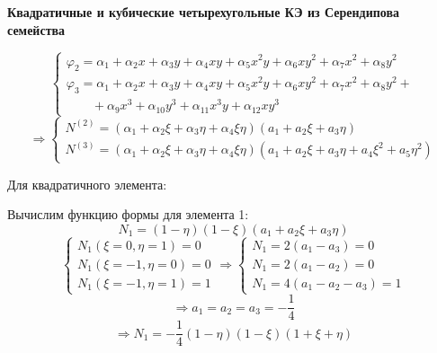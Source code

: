 \begin{center}
	\textbf{Квадратичные и кубические четырехугольные КЭ из Серендипова семейства}
\end{center}
\[
\begin{cases}
\varphi_2=\alpha_1+\alpha_2x+\alpha_3y+\alpha_4xy+\alpha_5x^2y+\alpha_6xy^2+\alpha_7x^2+\alpha_8y^2 \\
\varphi_3= \alpha_1+\alpha_2x+\alpha_3y+\alpha_4xy+\alpha_5x^2y+\alpha_6xy^2+\alpha_7x^2+\alpha_8y^2 + \\
\qquad +\alpha_9x^3+\alpha_{10}y^3+\alpha_{11}x^3y+\alpha_{12}xy^3
\end{cases}
\]
\[
\Rightarrow
\begin{cases}
	N^{(2)}=(\alpha_1+\alpha_2\xi+\alpha_3\eta+\alpha_4\xi\eta)(a_1+a_2\xi+a_3\eta) \\
	N^{(3)}=(\alpha_1+\alpha_2\xi+\alpha_3\eta+\alpha_4\xi\eta)(a_1+a_2\xi+a_3\eta+a_4\xi^2+a_5\eta^2)
\end{cases}
\]

Для квадратичного элемента:

\begin{center}
\end{center}

Вычислим функцию формы для элемента 1:
\[
	N_1=(1-\eta)(1-\xi)(a_1+a_2\xi+a_3\eta) 
\]
\[ \begin{cases}
	N_1(\xi=0, \eta=1)=0 \\
	N_1(\xi=-1, \eta=0) =0 \\
	N_1(\xi=-1, \eta=1) = 1 \end{cases} \Rightarrow \begin{cases} N_1=2(a_1-a_3)=0 \\ N_1=2(a_1-a_2)=0 \\ N_1 = 4(a_1-a_2-a_3)=1  \end{cases}
\]
\[
\Rightarrow a_1=a_2=a_3=-\frac{1}{4} 
\]
\[
	\Rightarrow N_1=-\frac{1}{4}(1-\eta)(1-\xi)(1+\xi+\eta) 
\]

